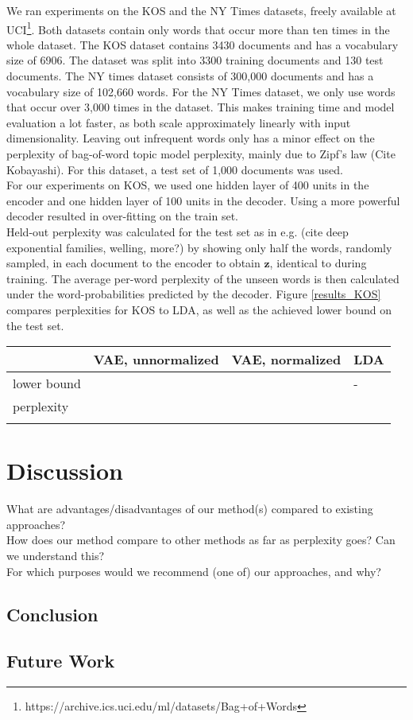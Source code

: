 \documentclass{report}
\begin{document}
	We ran experiments on the KOS and the NY Times datasets, freely available at UCI\footnote{https://archive.ics.uci.edu/ml/datasets/Bag+of+Words}. Both datasets contain only words that occur more than ten times in the whole dataset. The KOS dataset contains 3430 documents and has a vocabulary size of 6906. The dataset was split into 3300 training documents and 130 test documents. The NY times dataset consists of 300,000 documents and has a vocabulary size of 102,660 words. For the NY Times dataset, we only use words that occur over 3,000 times in the dataset. This makes training time and model evaluation a lot faster, as both scale approximately linearly with input dimensionality. Leaving out infrequent words only has a minor effect on the perplexity of bag-of-word topic model perplexity, mainly due to Zipf's law (Cite Kobayashi). For this dataset, a test set of 1,000 documents was used.
	\\
	For our experiments on KOS, we used one hidden layer of 400 units in the encoder and one hidden layer of 100 units in the decoder.  Using a more powerful decoder resulted in over-fitting on the train set. 
	\\
	Held-out perplexity was calculated for the test set as in e.g. (cite deep exponential families, welling, more?) by showing only half the words, randomly sampled, in each document to the encoder to obtain $\mathbf{z}$, identical to during training. The average per-word perplexity of the unseen words is then calculated under the word-probabilities predicted by the decoder.  Figure \ref{results_KOS} compares perplexities for KOS to LDA, as well as the achieved lower bound on the test set.
	\\
	
	
	\begin{tabular}{l|l|l|l}
		& VAE, unnormalized & VAE, normalized & LDA  \\
		\hline
		lower bound & & & - \\
		\hline
		perplexity & & & \\
		\label{results_KOS}
	\end{tabular}


\chapter{Discussion}
What are advantages/disadvantages of our method(s) compared to existing approaches?\\
How does our method compare to other methods as far as perplexity goes? Can we understand this?\\
For which purposes would we recommend (one of) our approaches, and why? \\
\section{Conclusion}
\section{Future Work}

\end{document}
